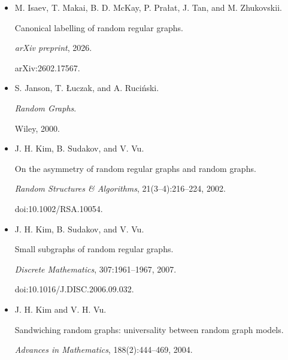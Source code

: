 \documentclass[10pt,a4paper]{article}
\begin{document}
\begin{itemize}
N. Immerman and E. S. Lander.


Describing graphs: A first-order approach to graph canonization.


In \emph{Complexity Theory Retrospective}, pages 59–81. Springer, New
York, 1990.





\item[] 
[29]

M. Isaev, T. Makai, B. D. McKay, P. Prałat, J. Tan, and M. Zhukovskii.


Canonical labelling of random regular graphs.


\emph{arXiv preprint}, 2026.


arXiv:2602.17567.





\item[] 
[30]

S. Janson, T. Łuczak, and A. Ruciński.


\emph{Random Graphs}.


Wiley, 2000.





\item[] 
[31]

J. H. Kim, B. Sudakov, and V. Vu.


On the asymmetry of random regular graphs and random graphs.


\emph{Random Structures \& Algorithms}, 21(3–4):216–224, 2002.


doi:10.1002/RSA.10054.





\item[] 
[32]

J. H. Kim, B. Sudakov, and V. Vu.


Small subgraphs of random regular graphs.


\emph{Discrete Mathematics}, 307:1961–1967, 2007.


doi:10.1016/J.DISC.2006.09.032.





\item[] 
[33]

J. H. Kim and V. H. Vu.


Sandwiching random graphs: universality between random graph models.


\emph{Advances in Mathematics}, 188(2):444–469, 2004.






\end{itemize}
\end{document}

